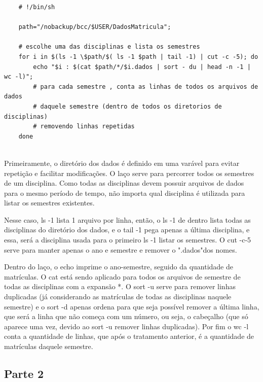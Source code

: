 \documentclass[oneside, 11 pt]{article}
\begin{document}
	\begin{lstlisting}
	# !/bin/sh
	
	path="/nobackup/bcc/$USER/DadosMatricula";
	
	# escolhe uma das disciplinas e lista os semestres
	for i in $(ls -1 \$path/$( ls -1 $path | tail -1) | cut -c -5); do
		echo "$i : $(cat $path/*/$i.dados | sort - du | head -n -1 | wc -l)";
		# para cada semestre , conta as linhas de todos os arquivos de dados
		# daquele semestre (dentro de todos os diretorios de disciplinas)
		# removendo linhas repetidas
	done
	
	\end{lstlisting}
	
	Primeiramente, o diretório dos dados é definido em uma varável para evitar repetição e facilitar modificações. O laço serve para percorrer todos os semestres de um disciplina. Como todas as disciplinas devem possuir arquivos de dados para o mesmo período de tempo, não importa qual disciplina é utilizada para listar os semestres existentes.
	
	Nesse caso, ls -1 lista 1 arquivo por linha, então, o ls -1 de dentro lista todas as disciplinas do diretório dos dados, e o tail -1 pega apenas a última disciplina, e essa, será a disciplina usada para o primeiro ls -1 listar os semestres. O cut -c-5 serve para manter apenas o ano e semestre e remover o ".dados"dos nomes.
	
	Dentro do laço, o echo imprime o ano-semestre, seguido da quantidade de matrículas. O cat está sendo aplicado para todos os arquivos de semestre de todas as disciplinas com a expansão *. O sort -u serve para remover linhas duplicadas (já considerando as matrículas de todas as disciplinas naquele semestre) e o sort -d apenas ordena para que seja possível remover a última linha, que será a linha que não começa com um número, ou seja, o cabeçalho (que só aparece uma vez, devido ao sort -u remover linhas duplicadas). Por fim o wc -l conta a quantidade de linhas, que após o tratamento anterior, é a quantidade de matrículas daquele semestre.
	
	\pagebreak
	\subsection{Parte 2}
	
\end{document}
